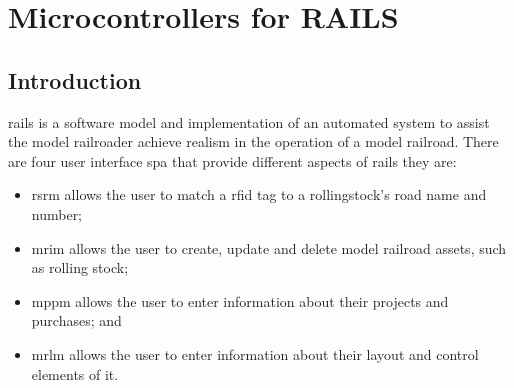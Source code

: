 \chapter{Microcontrollers for RAILS}
\section{Introduction}
\gls{rails} is a software model and implementation of an automated system to assist the model railroader achieve realism in the operation of a model railroad.
There are four user interface \gls{spa} that provide different aspects of rails they are:
\begin{itemize}
  \item \gls{rsrm} allows the user to match a rfid tag to a rollingstock's road name and number;
  \item \gls{mrim} allows the user to create, update and delete model railroad assets, such as rolling stock;
  \item \gls{mppm} allows the user to enter information about their projects and purchases; and
  \item \gls{mrlm} allows the user to enter information about their layout and control elements of it.
\end{itemize}
